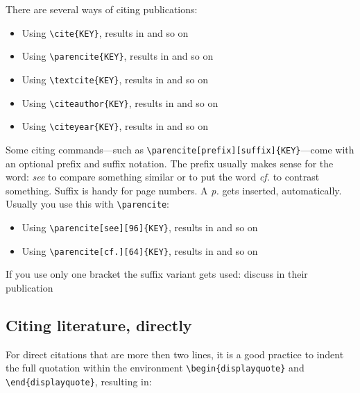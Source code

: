 There are several ways of citing publications:

\begin{itemize}
	\setlength\itemsep{-0.75em} %
	\item Using \verb|\cite{KEY}|, results in \cite{StaplesBieman1999} and so on 
	\item Using \verb|\parencite{KEY}|, results in \parencite{StaplesBieman1999} and so on 
	\item Using \verb|\textcite{KEY}|, results in \textcite{StaplesBieman1999} and so on 
	\item Using \verb|\citeauthor{KEY}|, results in \citeauthor{StaplesBieman1999} and so on 
	\item Using \verb|\citeyear{KEY}|, results in \citeyear{StaplesBieman1999} and so on 
\end{itemize}

Some citing commands---such as  \verb|\parencite[prefix][suffix]{KEY}|---come with an optional prefix and suffix notation. The prefix usually makes sense for the word: \textit{see} to compare something similar or to put the word \textit{cf.} to contrast something. Suffix is handy for page numbers. A \textit{p.} gets inserted, automatically. Usually you use this with \verb|\parencite|:

\begin{itemize}
	\setlength\itemsep{-0.75em} %
	\item Using \verb|\parencite[see][96]{KEY}|, results in \parencite[see][96]{StaplesBieman1999} and so on
	\item Using \verb|\parencite[cf.][64]{KEY}|, results in \parencite[cf.][64]{StaplesBieman1999} and so on 
\end{itemize}

If you use only one bracket the suffix variant gets used: \textcite[97]{StaplesBieman1999} discuss in their publication \textellipsis

\subsection{Citing literature, directly}

For direct citations that are more then two lines, it is a good practice to indent the full quotation within the environment \verb|\begin{displayquote}| and \verb|\end{displayquote}|, resulting in:

